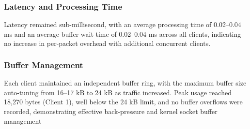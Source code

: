 \subsubsection{Latency and Processing Time}
Latency remained sub-millisecond, with an average processing time of 0.02–0.04 ms and an average buffer wait time of 0.02–0.04 ms across all clients, indicating no increase in per-packet overhead with additional concurrent clients.
\subsubsection{Buffer Management}
Each client maintained an independent buffer ring, with the maximum buffer size auto-tuning from 16–17 kB to 24 kB as traffic increased. Peak usage reached 18,270 bytes (Client 1), well below the 24 kB limit, and no buffer overflows were recorded, demonstrating effective back-pressure and kernel socket buffer management



